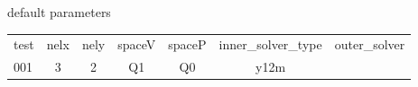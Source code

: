

default parameters




\begin{tabular}{lcccccc}
test & nelx & nely & spaceV & spaceP & inner\_solver\_type & outer\_solver \\
001  &    3 &    2 &     Q1 &     Q0 &                y12m &               \\ 
\end{tabular}
